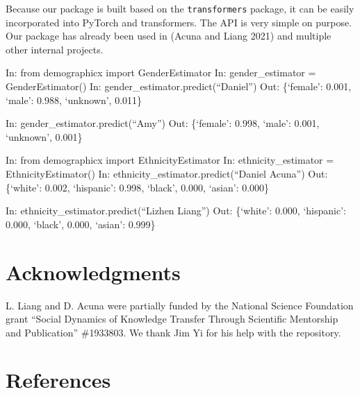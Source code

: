 \documentclass[]{article}
\newenvironment{Shaded}{}{}
\newcommand{\FloatTok}[1]{\textcolor[rgb]{0.25,0.63,0.44}{#1}}
\newcommand{\ImportTok}[1]{#1}
\newcommand{\NormalTok}[1]{#1}
\newcommand{\OperatorTok}[1]{\textcolor[rgb]{0.40,0.40,0.40}{#1}}
\begin{document}
Because our package is built based on the \texttt{transformers} package,
it can be easily incorporated into PyTorch and transformers. The API is
very simple on purpose. Our package has already been used in (Acuna and
Liang 2021) and multiple other internal projects.

\begin{Shaded}
\begin{Highlighting}[]
\NormalTok{In: }\ImportTok{from}\NormalTok{ demographicx }\ImportTok{import}\NormalTok{ GenderEstimator}
\NormalTok{In: gender_estimator }\OperatorTok{=}\NormalTok{ GenderEstimator()}
\NormalTok{In: gender_estimator.predict(“Daniel”)}
\NormalTok{Out: \{‘female’: }\FloatTok{0.001}\NormalTok{, ‘male’: }\FloatTok{0.988}\NormalTok{, ‘unknown’, }\FloatTok{0.011}\NormalTok{\}}

\NormalTok{In: gender_estimator.predict(“Amy”)}
\NormalTok{Out: \{‘female’: }\FloatTok{0.998}\NormalTok{, ‘male’: }\FloatTok{0.001}\NormalTok{, ‘unknown’, }\FloatTok{0.001}\NormalTok{\}}

\NormalTok{In: }\ImportTok{from}\NormalTok{ demographicx }\ImportTok{import}\NormalTok{ EthnicityEstimator}
\NormalTok{In: ethnicity_estimator }\OperatorTok{=}\NormalTok{ EthnicityEstimator()}
\NormalTok{In: ethnicity_estimator.predict(“Daniel Acuna”)}
\NormalTok{Out: \{‘white’: }\FloatTok{0.002}\NormalTok{, ‘hispanic’: }\FloatTok{0.998}\NormalTok{, ‘black’, }\FloatTok{0.000}\NormalTok{, ‘asian’: }\FloatTok{0.000}\NormalTok{\}}

\NormalTok{In: ethnicity_estimator.predict(“Lizhen Liang”)}
\NormalTok{Out: \{‘white’: }\FloatTok{0.000}\NormalTok{, ‘hispanic’: }\FloatTok{0.000}\NormalTok{, ‘black’, }\FloatTok{0.000}\NormalTok{, ‘asian’: }\FloatTok{0.999}\NormalTok{\}}
\end{Highlighting}
\end{Shaded}

\hypertarget{acknowledgments}{%
\section{Acknowledgments}\label{acknowledgments}}

L. Liang and D. Acuna were partially funded by the National Science
Foundation grant ``Social Dynamics of Knowledge Transfer Through
Scientific Mentorship and Publication'' \#1933803. We thank Jim Yi for
his help with the repository.

\hypertarget{references}{%
\section*{References}\label{references}}
\end{document}
